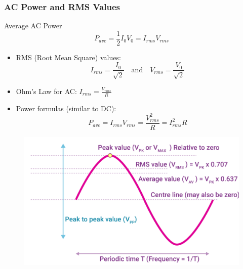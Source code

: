 \documentclass{beamer}
\begin{document}
\begin{frame}
    \frametitle{AC Power and RMS Values}
    \begin{block}{Average AC Power}
        \[ P_{ave} = \frac{1}{2}I_0V_0 = I_{rms}V_{rms} \]
    \end{block}
    \begin{itemize}
        \item RMS (Root Mean Square) values:
        \[ I_{rms} = \frac{I_0}{\sqrt{2}} \quad \text{and} \quad V_{rms} = \frac{V_0}{\sqrt{2}} \]
        \item Ohm's Law for AC: $I_{rms} = \frac{V_{rms}}{R}$
        \item Power formulas (similar to DC):
        \[ P_{ave} = I_{rms}V_{rms} = \frac{V_{rms}^2}{R} = I_{rms}^2R \]
    \end{itemize}
  \end{frame}

\begin{frame}
\begin{figure}
      \centering
      \includegraphics[width=0.75\linewidth]{rms.png}
  \end{figure}
\end{frame}
\end{document}
